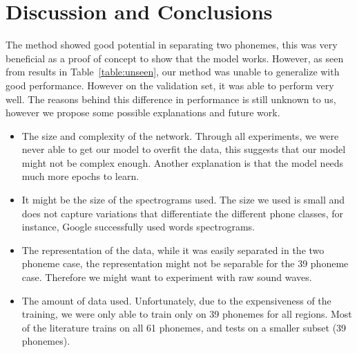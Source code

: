 \documentclass[a4paper,12pt]{article}
\begin{document}
\section{Discussion and Conclusions}
The method showed good potential in separating two phonemes, this was very beneficial as a proof of concept to show that the model works. However, as seen from results in Table~\ref{table:unseen}, our method was unable to generalize with good performance. However on the validation set, it was able to perform very well. The reasons behind this difference in performance is still unknown to us, however we propose some possible explanations and future work.

\begin{itemize}
\item The size and complexity of the network. Through all experiments, we were never able to get our model to overfit the data, this suggests that our model might not be complex enough. Another explanation is that the model needs much more epochs to learn.

\item It might be the size of the spectrograms used. The size we used is small and does not capture variations that differentiate the different phone classes, for instance, Google successfully used words spectrograms.

\item The representation of the data, while it was easily separated in the two phoneme case, the representation might not be separable for the 39 phoneme case. Therefore we might want to experiment with raw sound waves.

\item The amount of data used. Unfortunately, due to the expensiveness of the training, we were only able to train only on 39 phonemes for all regions. Most of the literature trains on all 61 phonemes, and tests on a smaller subset (39 phonemes).

\end{itemize}



\end{document}
